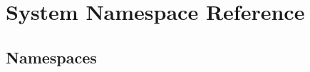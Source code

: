 \hypertarget{namespace_system}{}\section{System Namespace Reference}
\label{namespace_system}
\subsection*{Namespaces}
\begin{DoxyCompactItemize}
\end{DoxyCompactItemize}
